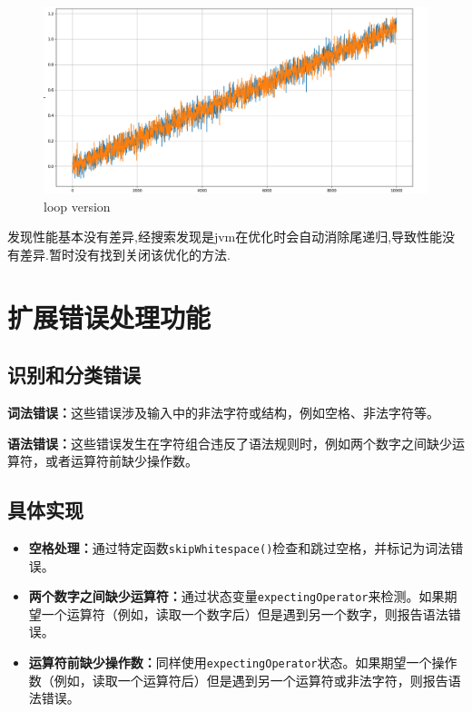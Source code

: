 \documentclass{article}
\begin{document}
\begin{figure}[H]
    \includegraphics[width=\textwidth]{element/5.png}
    \caption{loop version}
\end{figure}
发现性能基本没有差异,经搜索发现是jvm在优化时会自动消除尾递归,导致性能没有差异.暂时没有找到关闭该优化的方法.
\section{扩展错误处理功能}
\subsection{识别和分类错误}
\textbf{词法错误：}这些错误涉及输入中的非法字符或结构，例如空格、非法字符等。

\textbf{语法错误：}这些错误发生在字符组合违反了语法规则时，例如两个数字之间缺少运算符，或者运算符前缺少操作数。

\subsection{具体实现}
\begin{itemize}
    \item \textbf{空格处理：}通过特定函数\texttt{skipWhitespace()}检查和跳过空格，并标记为词法错误。
    \item \textbf{两个数字之间缺少运算符：}通过状态变量\texttt{expectingOperator}来检测。如果期望一个运算符（例如，读取一个数字后）但是遇到另一个数字，则报告语法错误。
    \item \textbf{运算符前缺少操作数：}同样使用\texttt{expectingOperator}状态。如果期望一个操作数（例如，读取一个运算符后）但是遇到另一个运算符或非法字符，则报告语法错误。
\end{itemize}
\end{document}
